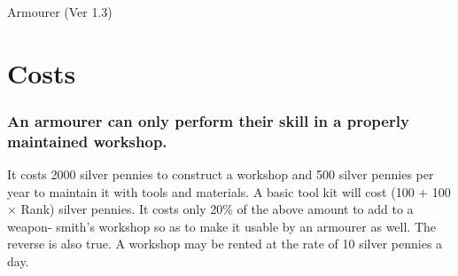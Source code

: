 \begin{Chapter}{Armourer (Ver 1.3)}
\section{Costs}

\subsubsection{An armourer can only perform their skill in a properly maintained
workshop.}

It costs 2000 silver pennies to construct a workshop and 500 silver
pennies per year to maintain it with tools and materials. A basic tool
kit will cost (100 + 100 × Rank) silver pennies.  It costs only 20\%
of the above amount to add to a weapon- smith’s workshop so as to make
it usable by an armourer as well. The reverse is also true. A workshop
may be rented at the rate of 10 silver pennies a day.

\end{Chapter}
